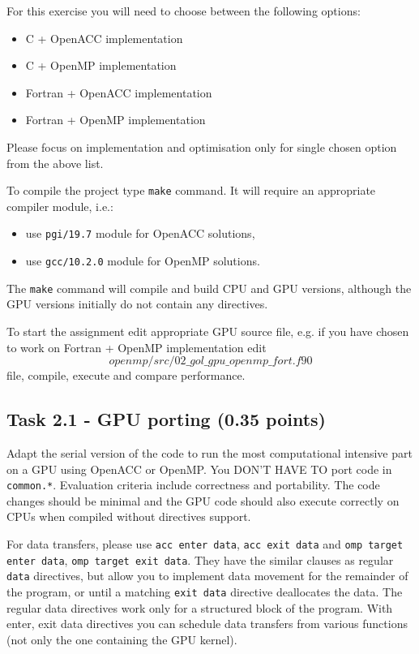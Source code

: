\documentclass[a4paper, 11pt]{article}
\begin{document}
	For this exercise you will need to choose between the following options:
	\begin{itemize}
		\item C + OpenACC implementation
		\item C + OpenMP implementation
		\item Fortran + OpenACC implementation
		\item Fortran + OpenMP implementation
	\end{itemize}
	Please focus on implementation and optimisation only for single chosen option from the above list.

	To compile the project type \texttt{make} command. It will require an appropriate compiler module, i.e.:
        \begin{itemize}
		\item use \texttt{pgi/19.7} module for OpenACC solutions,
		\item use \texttt{gcc/10.2.0} module for OpenMP solutions.
	\end{itemize}
	The \texttt{make} command will compile and build CPU and GPU versions, although the GPU versions initially do not contain any directives. 

	To start the assignment edit appropriate GPU source file, e.g. if you have chosen to work on Fortran + OpenMP implementation edit \[openmp/src/02\_gol\_gpu\_openmp\_fort.f90\] file, compile, execute and compare performance. 

        \subsection{Task 2.1 - GPU porting (0.35 points)}

	Adapt the serial version of the code to run the most computational intensive part on a GPU using OpenACC or OpenMP. You DON'T HAVE TO port code in \texttt{common.*}. Evaluation criteria include correctness and portability. The code changes should be minimal and the GPU code should also execute correctly on CPUs when compiled without directives support. 
	
	For data transfers, please use \texttt{acc enter data}, \texttt{acc exit data} and \texttt{omp target enter data}, \texttt{omp target exit data}. They have the similar clauses as regular \texttt{data} directives, but allow you to implement data movement for the remainder of the program, or until a matching \texttt{exit data} directive deallocates the data. The regular data directives work only for a structured block of the program. With enter, exit data directives you can schedule data transfers from various functions (not only the one containing the GPU kernel). 
\end{document}

